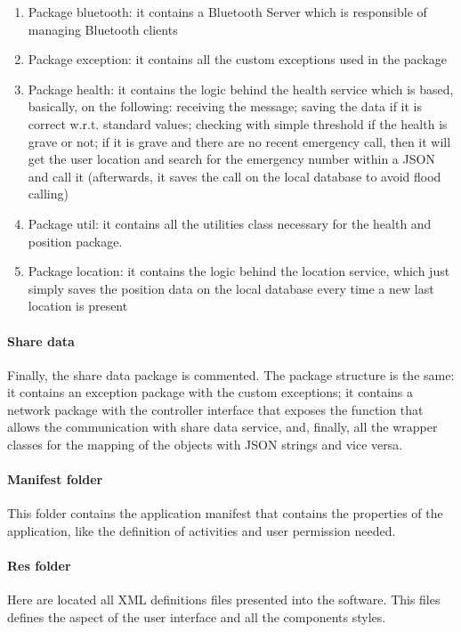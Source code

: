 \begin{enumerate}
\item Package bluetooth: it contains a Bluetooth Server which is responsible of managing Bluetooth clients
\item Package exception: it contains all the custom exceptions used in the package
\item Package health: it contains the logic behind the health service which is based, basically, on the following: receiving the message;
saving the data if it is correct w.r.t. standard values; checking with simple threshold if the health is grave or not; if it is grave and
there are no recent emergency call, then it will get the user location and search for the emergency number within a JSON and call it
(afterwards, it saves the call on the local database to avoid flood calling)
\item Package util: it contains all the utilities class necessary for the health and position package.
\item Package location: it contains the logic behind the location service, which just simply saves the position data on the local database
every time a new last location is present
\end{enumerate}

\paragraph{Share data}
Finally, the share data package is commented. 
The package structure is the same: it contains an exception package with the custom exceptions; it contains a network package with the
controller interface that exposes the function that allows the communication with share data service, and, finally, all the wrapper classes
for the mapping of the objects with JSON strings and vice versa.

\paragraph{Manifest folder}
This folder contains the application manifest that contains the properties of the application, like the definition of activities and user permission needed. 

\paragraph{Res folder}
Here are located all XML definitions files presented into the software. 
This files defines the aspect of the user interface and all the components styles.

